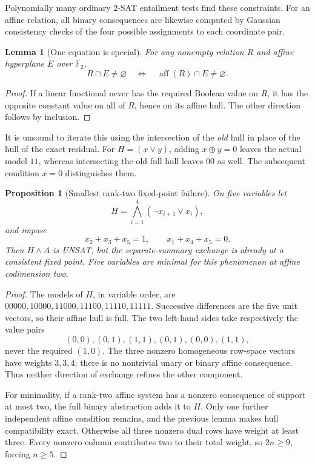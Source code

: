 \documentclass[11pt]{article}
\newtheorem{lemma}[theorem]{Lemma}
\newtheorem{proposition}[theorem]{Proposition}
\newcommand{\F}{\mathbb F_2}
\newcommand{\aff}{\operatorname{aff}}
\begin{document}
Polynomially many ordinary 2-SAT entailment tests find these constraints.
For an affine relation, all binary consequences are likewise computed by
Gaussian consistency checks of the four possible assignments to each
coordinate pair.

\begin{lemma}[One equation is special]
For any nonempty relation \(R\) and affine hyperplane \(E\) over \(\F\),
\[
 R\cap E\ne\varnothing
 \quad\Longleftrightarrow\quad
 \aff(R)\cap E\ne\varnothing.
\]
\end{lemma}
\begin{proof}
If a linear functional never has the required Boolean value on \(R\),
it has the opposite constant value on all of \(R\), hence on its affine
hull. The other direction follows by inclusion.
\end{proof}

It is unsound to iterate this using the intersection of the \emph{old}
hull in place of the hull of the exact residual. For \(H=(x\vee y)\),
adding \(x\oplus y=0\) leaves the actual model \(11\), whereas intersecting
the old full hull leaves \(00\) as well. The subsequent condition \(x=0\)
distinguishes them.

\begin{proposition}[Smallest rank-two fixed-point failure]
On five variables let
\[
 H=\bigwedge_{i=1}^{4}(\neg x_{i+1}\vee x_i),
\]
and impose
\[
 x_2+x_3+x_5=1,\qquad x_1+x_4+x_5=0.
\]
Then \(H\land A\) is UNSAT, but the separate-summary exchange is already
at a consistent fixed point. Five variables are minimal for this
phenomenon at affine codimension two.
\end{proposition}
\begin{proof}
The models of \(H\), in variable order, are
\(00000,10000,11000,11100,11110,11111\).
Successive differences are the five unit vectors, so their affine hull
is full. The two left-hand sides take respectively the value pairs
\[
 (0,0),(0,1),(1,1),(0,1),(0,0),(1,1),
\]
never the required \((1,0)\).
The three nonzero homogeneous row-space vectors have weights \(3,3,4\);
there is no nontrivial unary or binary affine consequence. Thus neither
direction of exchange refines the other component.

For minimality, if a rank-two affine system has a nonzero consequence
of support at most two, the full binary abstraction adds it to \(H\).
Only one further independent affine condition remains, and the previous
lemma makes hull compatibility exact. Otherwise all three nonzero
dual rows have weight at least three. Every nonzero column contributes
two to their total weight, so \(2n\ge9\), forcing \(n\ge5\).
\end{proof}
\end{document}
